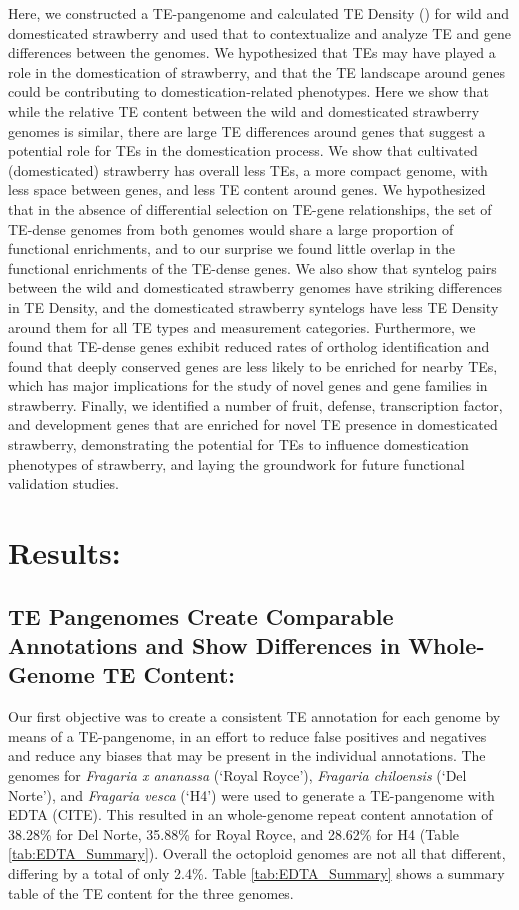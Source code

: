 \documentclass[fleqn,10pt]{olplainarticle}
\begin{document}
Here, we constructed a TE-pangenome and calculated TE Density (\cite{Teresi2022}) for wild and domesticated strawberry and used that to contextualize and analyze TE and gene differences between the genomes.
We hypothesized that TEs may have played a role in the domestication of strawberry, and that the TE landscape around genes could be contributing to domestication-related phenotypes.
Here we show that while the relative TE content between the wild and domesticated strawberry genomes is similar, there are large TE differences around genes that suggest a potential role for TEs in the domestication process.
We show that cultivated (domesticated) strawberry has overall less TEs, a more compact genome, with less space between genes, and less TE content around genes.
We hypothesized that in the absence of differential selection on TE-gene relationships, the set of TE-dense genomes from both genomes would share a large proportion of functional enrichments, and to our surprise we found little overlap in the functional enrichments of the TE-dense genes.
We also show that syntelog pairs between the wild and domesticated strawberry genomes have striking differences in TE Density, and the domesticated strawberry syntelogs have less TE Density around them for all TE types and measurement categories.
Furthermore, we found that TE-dense genes exhibit reduced rates of ortholog identification and found that deeply conserved genes are less likely to be enriched for nearby TEs, which has major implications for the study of novel genes and gene families in strawberry.
Finally, we identified a number of fruit, defense, transcription factor, and development genes that are enriched for novel TE presence in domesticated strawberry, demonstrating the potential for TEs to influence domestication phenotypes of strawberry, and laying the groundwork for future functional validation studies. \\ 

\section*{Results:}
\subsection*{TE Pangenomes Create Comparable Annotations and Show Differences in Whole-Genome TE Content:}
Our first objective was to create a consistent TE annotation for each genome by means of a TE-pangenome, in an effort to reduce false positives and negatives and reduce any biases that may be present in the individual annotations.
The genomes for \textit{Fragaria x ananassa} (`Royal Royce'), \textit{Fragaria chiloensis} (`Del Norte'), and \textit{Fragaria vesca} (`H4') were used to generate a TE-pangenome with EDTA (CITE).
This resulted in an whole-genome repeat content annotation of 38.28\% for Del Norte, 35.88\% for Royal Royce, and 28.62\% for H4 (Table \ref{tab:EDTA_Summary}).
Overall the octoploid genomes are not all that different, differing by a total of only 2.4\%.
Table \ref{tab:EDTA_Summary} shows a summary table of the TE content for the three genomes.
\end{document}
